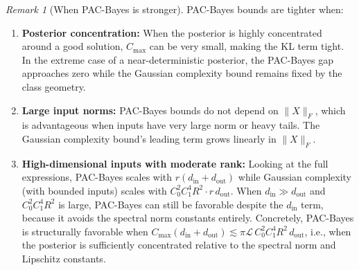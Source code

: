 \documentclass{article}
\theoremstyle{plain}
\theoremstyle{definition}
\theoremstyle{remark}
\newtheorem{remark}[theorem]{Remark}
\begin{document}
\begin{remark}[When PAC-Bayes is stronger]
PAC-Bayes bounds are tighter when:
\begin{enumerate}
    \item \textbf{Posterior concentration:} When the posterior is highly concentrated around a good solution, $C_{\max}$ can be very small, making the KL term tight. In the extreme case of a near-deterministic posterior, the PAC-Bayes gap approaches zero while the Gaussian complexity bound remains fixed by the class geometry.
    \item \textbf{Large input norms:} PAC-Bayes bounds do not depend on $\|X\|_F$, which is advantageous when inputs have very large norm or heavy tails. The Gaussian complexity bound's leading term grows linearly in $\|X\|_F$.
    \item \textbf{High-dimensional inputs with moderate rank:} Looking at the full expressions, PAC-Bayes scales with $r(d_{\text{in}} + d_{\text{out}})$ while Gaussian complexity (with bounded inputs) scales with $C_0^2 C_1^4 R^2 \cdot r\,d_{\text{out}}$. When $d_{\text{in}} \gg d_{\text{out}}$ and $C_0^2 C_1^4 R^2$ is large, PAC-Bayes can still be favorable despite the $d_{\text{in}}$ term, because it avoids the spectral norm constants entirely. Concretely, PAC-Bayes is structurally favorable when $C_{\max}(d_{\text{in}} + d_{\text{out}}) \lesssim \pi\mathcal{L}\, C_0^2 C_1^4 R^2\, d_{\text{out}}$, i.e., when the posterior is sufficiently concentrated relative to the spectral norm and Lipschitz constants.
\end{enumerate}
\end{remark}
\end{document}
